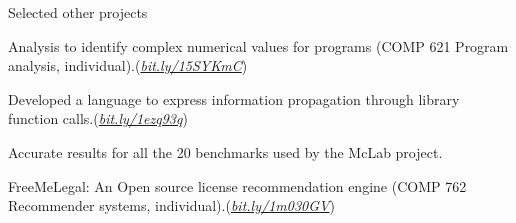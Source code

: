 \documentclass{resume} %
\begin{document}
\begin{rSection}{Selected other projects}\smallskip \begin{lSubsection}
%
\item Analysis to identify complex numerical values for \matlab programs (COMP
621 Program analysis,
individual).(\href{https://github.com/Sable/mclab/tree/master/languages/Natlab/src/natlab/tame/valueanalysis/components/isComplex}{\em{bit.ly/15SYKmC}}) 
\begin{lsubSubsection}
\item Developed a language to express information propagation through library
function calls.(\href{http://bit.ly/1ezq93q}{\em{bit.ly/1ezq93q}})
\item Accurate results for all the 20 benchmarks used by the 
McLab project.   
\end{lsubSubsection}

\item FreeMeLegal: An Open source license recommendation
engine (COMP 762 Recommender systems,
individual).(\href{http://bit.ly/1m030GV}{\em{bit.ly/1m030GV}}) 
\end{lSubsection}
\end{rSection}

\end{document}
